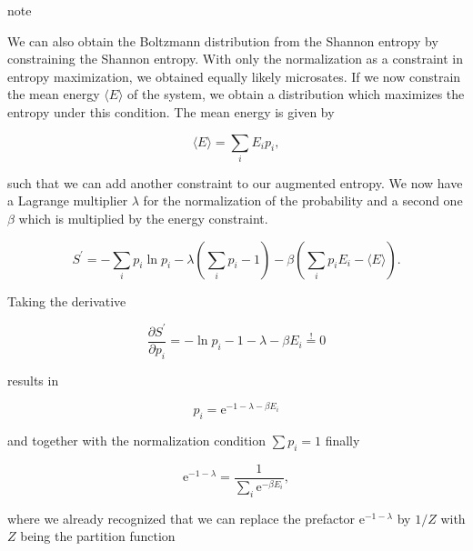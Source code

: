 \documentclass[letterpaper,10pt,english]{sphinxmanual}
\begin{document}
\begin{sphinxadmonition}{note}{}\unskip
\sphinxAtStartPar
{}

\sphinxAtStartPar
We can also obtain the Boltzmann distribution from the Shannon entropy by constraining the Shannon entropy. With only the normalization as a constraint in entropy maximization, we obtained equally likely microsates. If we now constrain the mean energy \(\langle E\rangle\) of the system, we obtain a distribution which maximizes the entropy under this condition. The mean energy is given by

\sphinxAtStartPar
\begin{equation}
\langle E\rangle=\sum_{i} E_{i} p_{i},
\end{equation}

\sphinxAtStartPar
such that we can add another constraint to our augmented entropy. We now have a Lagrange multiplier \(\lambda\) for the normalization of the probability and a second one \(\beta\) which is multiplied by the energy constraint.

\sphinxAtStartPar
\begin{equation}
S^{\prime}=-\sum_{i} p_{i} \ln p_{i}-\lambda\left(\sum_{i} p_{i}-1\right)-\beta\left(\sum_{i} p_{i} E_{i}-\langle E\rangle\right).
\end{equation}

\sphinxAtStartPar
Taking the derivative

\sphinxAtStartPar
\begin{equation}
\frac{\partial S^{\prime}}{\partial p_{i}}=-\ln p_{i}-1-\lambda-\beta E_i\overset{!}{=} 0
\end{equation}

\sphinxAtStartPar
results in

\sphinxAtStartPar
\begin{equation}
p_{i}=\mathrm{e}^{-1-\lambda-\beta E_{i}}
\end{equation}

\sphinxAtStartPar
and together with the normalization condition \(\sum p_i=1\) finally

\sphinxAtStartPar
\begin{equation}
\mathrm{e}^{-1-\lambda}=\frac{1}{\sum_{i} \mathrm{e}^{-\beta E_{i}}},
\end{equation}

\sphinxAtStartPar
where we already recognized that we can replace the prefactor \(\mathrm{e}^{-1-\lambda}\) by \(1/Z\) with \(Z\) being the partition function


\end{sphinxadmonition}
\end{document}

